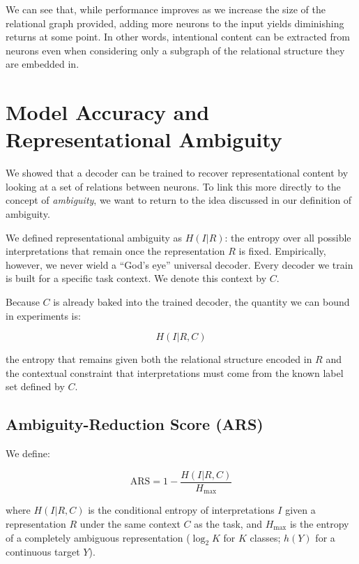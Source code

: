 \documentclass[11pt]{article}
\begin{document}
We can see that, while performance improves as we increase the size of the relational graph provided, adding more neurons to the input yields diminishing returns at some point. In other words, intentional content can be extracted from neurons even when considering only a subgraph of the relational structure they are embedded in.

\section{Model Accuracy and Representational Ambiguity}

We showed that a decoder can be trained to recover representational content by looking at a set of relations between neurons. To link this more directly to the concept of \emph{ambiguity}, we want to return to the idea discussed in our definition of ambiguity.

We defined representational ambiguity as $H(I|R)$: the entropy over all possible interpretations that remain once the representation $R$ is fixed. Empirically, however, we never wield a ``God's eye'' universal decoder. Every decoder we train is built for a specific task context. We denote this context by $C$.

Because $C$ is already baked into the trained decoder, the quantity we can bound in experiments is:

\begin{equation}
H(I|R,C)
\end{equation}

the entropy that remains given both the relational structure encoded in $R$ and the contextual constraint that interpretations must come from the known label set defined by $C$.

\subsection{Ambiguity-Reduction Score (ARS)}

We define:

\begin{equation}
\text{ARS} = 1 - \frac{H(I|R,C)}{H_{\max}}
\end{equation}

where $H(I|R,C)$ is the conditional entropy of interpretations $I$ given a representation $R$ under the same context $C$ as the task, and $H_{\max}$ is the entropy of a completely ambiguous representation ($\log_2 K$ for $K$ classes; $h(Y)$ for a continuous target $Y$).
\end{document}
